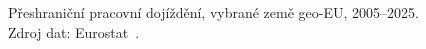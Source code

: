 \def\strProblemyDojezdeniVyvojTitle{Přeshraniční pracovní dojíždění}%
\def\strProblemyDojezdeniVyvojYlabel{podíl pracujících [\%]}%
\def\strProblemyDojezdeniVyvojCaption{Přeshraniční pracovní dojíždění, vybrané země \acs{geo-EU}, 2005--2025. Zdroj dat: Eurostat~\cite{eurostat_lfst_r_lfe2ecomm}.}%
%

\providecommand\NudgeProblemyDojezdeniVyvojCz{-11pt}%
\providecommand\NudgeProblemyDojezdeniVyvojAt{0pt}%
\providecommand\NudgeProblemyDojezdeniVyvojDe{0pt}%
\providecommand\NudgeProblemyDojezdeniVyvojDk{0pt}%
\providecommand\NudgeProblemyDojezdeniVyvojPl{-11pt}%
\providecommand\NudgeProblemyDojezdeniVyvojSk{20pt}%
\begin{figure}[htb]
  \centering
  
  \caption{\strProblemyDojezdeniVyvojCaption}
  \label{fig:problemy_dojezdeni_vyvoj}
\end{figure}
